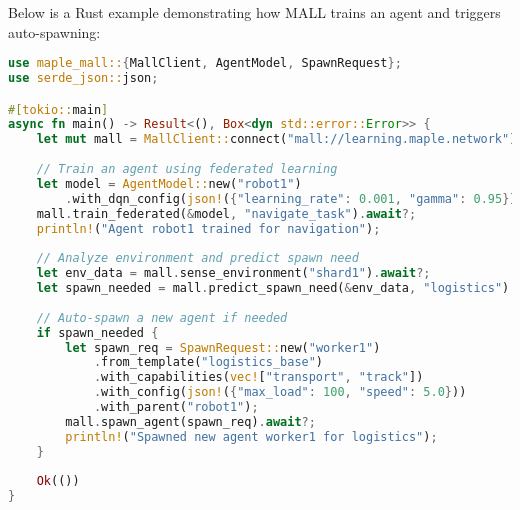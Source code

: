 \documentclass[a4paper,11pt]{article}
\begin{document}
Below is a Rust example demonstrating how MALL trains an agent and triggers auto-spawning:
\begin{lstlisting}[language=Rust, caption={Rust MALL Example}, label={lst:mall-train}]
use maple_mall::{MallClient, AgentModel, SpawnRequest};
use serde_json::json;

#[tokio::main]
async fn main() -> Result<(), Box<dyn std::error::Error>> {
    let mut mall = MallClient::connect("mall://learning.maple.network").await?;
    
    // Train an agent using federated learning
    let model = AgentModel::new("robot1")
        .with_dqn_config(json!({"learning_rate": 0.001, "gamma": 0.95}));
    mall.train_federated(&model, "navigate_task").await?;
    println!("Agent robot1 trained for navigation");
    
    // Analyze environment and predict spawn need
    let env_data = mall.sense_environment("shard1").await?;
    let spawn_needed = mall.predict_spawn_need(&env_data, "logistics").await?;
    
    // Auto-spawn a new agent if needed
    if spawn_needed {
        let spawn_req = SpawnRequest::new("worker1")
            .from_template("logistics_base")
            .with_capabilities(vec!["transport", "track"])
            .with_config(json!({"max_load": 100, "speed": 5.0}))
            .with_parent("robot1");
        mall.spawn_agent(spawn_req).await?;
        println!("Spawned new agent worker1 for logistics");
    }
    
    Ok(())
}
\end{lstlisting}
\vspace{0.5cm}
\end{document}
